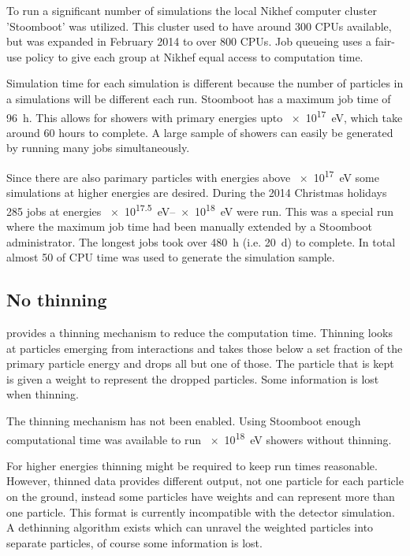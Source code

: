 To run a significant number of simulations the local Nikhef computer
cluster 'Stoomboot' was utilized. This cluster used to have around 300
CPUs available, but was expanded in February 2014 to over 800 CPUs. Job
queueing uses a fair-use policy to give each group at Nikhef equal
access to computation time.

Simulation time for each simulation is different because the number of
particles in a simulations will be different each run. Stoomboot has a
maximum job time of \SI{96}{\hour}. This allows for showers with primary
energies upto \SI{e17}{\electronvolt}, which take around 60 hours to
complete. A large sample of showers can easily be generated by running
many jobs simultaneously.

Since there are also parimary particles with energies above
\SI{e17}{\electronvolt} some simulations at higher energies are desired.
During the 2014 Christmas holidays 285 jobs at energies
\SIrange{e17.5}{e18}{\electronvolt} were run. This was a special run
where the maximum job time had been manually extended by a Stoomboot
administrator. The longest jobs took over \SI{480}{\hour} (i.e.
\SI{20}{\day}) to complete. In total almost \SI{50}{\year} of CPU time
was used to generate the simulation sample.

\begin{figure} \centering 
\caption{}
\label{fig:simulations_shower_walltime} \end{figure}


\subsection{No thinning}

\corsika provides a thinning mechanism to reduce the computation time.
Thinning looks at particles emerging from interactions and takes those
below a set fraction of the primary particle energy and drops all but
one of those. The particle that is kept is given a weight to represent
the dropped particles. Some information is lost when thinning.

The thinning mechanism has not been enabled. Using Stoomboot enough
computational time was available to run \SI{e18}{\electronvolt} showers
without thinning.

For higher energies thinning might be required to keep run times
reasonable. However, thinned data provides different output, not one
particle for each particle on the ground, instead some particles have
weights and can represent more than one particle. This format is
currently incompatible with the detector simulation. A dethinning
algorithm exists \cite{stokes2012} which can unravel the weighted
particles into separate particles, of course some information is lost.

